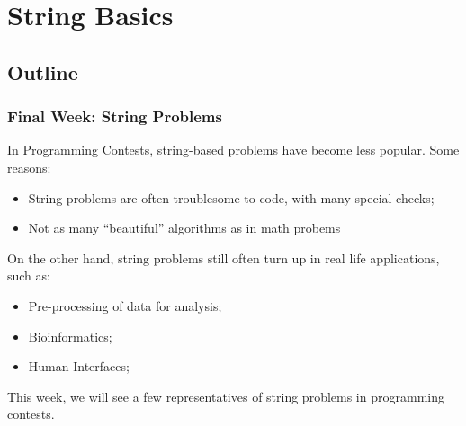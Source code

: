\documentclass{beamer}
\begin{document}
\section{String Basics}
\subsection{Outline}

\begin{frame}
  \frametitle{Final Week: String Problems}
  {\smaller
  
    \begin{block}{}
      In Programming Contests, string-based problems have become less
      popular. Some reasons:
      \begin{itemize}
        \item String problems are often troublesome to code, with many special checks;
        \item Not as many ``beautiful'' algorithms as in math probems
      \end{itemize}
    \end{block}

    \begin{exampleblock}{}
      On the other hand, string problems still often turn up in real
      life applications, such as:
      \begin{itemize}
      \item Pre-processing of data for analysis;
      \item Bioinformatics;
      \item Human Interfaces;
      \end{itemize}
    \end{exampleblock}

    This week, we will see a few representatives of string problems in
    programming contests.
  }
\end{frame}



\end{document}

